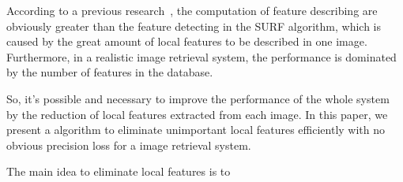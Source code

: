 According to a previous research~\cite{Fang2011ispass}, the computation of feature describing are obviously greater than the feature detecting in the SURF algorithm, which is caused by the great amount of local features to be described in one image. Furthermore, in a realistic image retrieval system, the performance is dominated by the number of features in the database.

So, it's possible and necessary to improve the performance of the whole system by the reduction of local features extracted from each image. In this paper, we present a algorithm to eliminate unimportant local features efficiently with no obvious precision loss for a image retrieval system.

The main idea to eliminate local features is to 